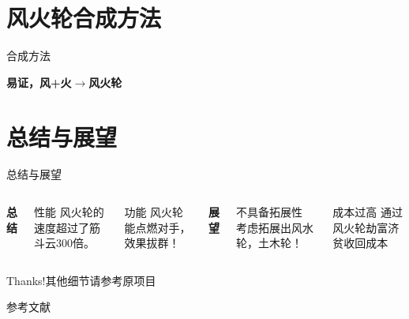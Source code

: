 \documentclass[aspectratio=32,fontset=fandol]{beamer}
\begin{document}
	
	\section{风火轮合成方法}
	
	\begin{frame}{合成方法}	\begin{center}\textbf{易证，风+火$\rightarrow$风火轮}\end{center}

	    
	\end{frame}
	
	\section{总结与展望}
	
	\begin{frame}{总结与展望}
			
			\begin{columns}[T,onlytextwidth]
				\textbf{总结}
				\begin{alertblock}{性能}
					风火轮的速度超过了筋斗云300倍。
				\end{alertblock}
				
				\begin{alertblock}{功能}
					风火轮能点燃对手，效果拔群！
				\end{alertblock}
				
				\textbf{展望}
				\begin{alertblock}{不具备拓展性}
					考虑拓展出风水轮，土木轮！
				\end{alertblock}
				
				\begin{alertblock}{成本过高}
					通过风火轮劫富济贫收回成本
				\end{alertblock}
			\end{columns}
	\end{frame}

	
	\begin{frame}[standout]
		Thanks!其他细节请参考原项目\cite{mtheme}
	\end{frame}
	
	\begin{frame}[allowframebreaks]{参考文献}
		
		
		
		
	\end{frame}
	
\end{document}
